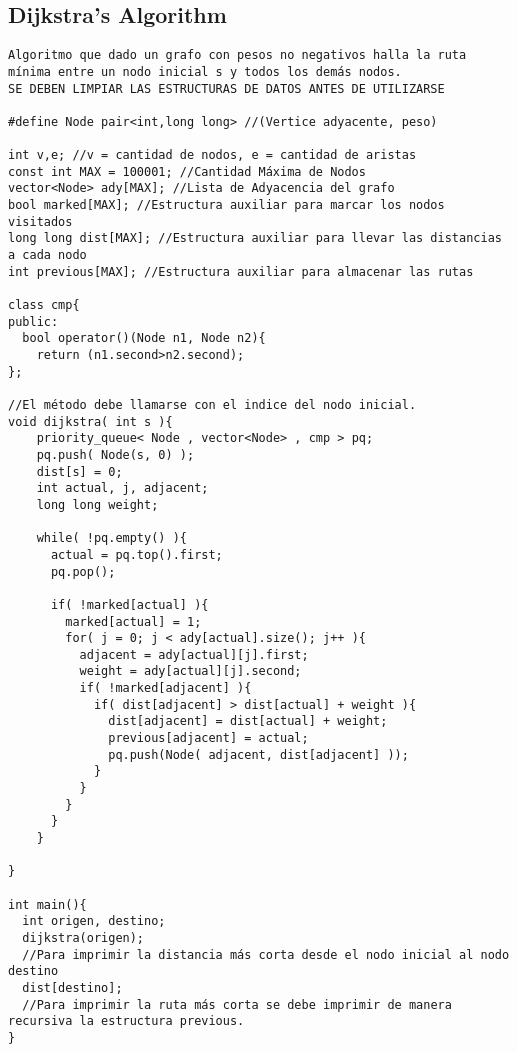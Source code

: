 \documentclass[10pt,letterpaper,twocolumn,twosided]{article}
\begin{document}
\subsection{Dijkstra's Algorithm}
\begin{lstlisting}
Algoritmo que dado un grafo con pesos no negativos halla la ruta mínima entre un nodo inicial s y todos los demás nodos.
SE DEBEN LIMPIAR LAS ESTRUCTURAS DE DATOS ANTES DE UTILIZARSE

#define Node pair<int,long long> //(Vertice adyacente, peso)

int v,e; //v = cantidad de nodos, e = cantidad de aristas
const int MAX = 100001; //Cantidad Máxima de Nodos
vector<Node> ady[MAX]; //Lista de Adyacencia del grafo
bool marked[MAX]; //Estructura auxiliar para marcar los nodos visitados
long long dist[MAX]; //Estructura auxiliar para llevar las distancias a cada nodo
int previous[MAX]; //Estructura auxiliar para almacenar las rutas

class cmp{
public:
  bool operator()(Node n1, Node n2){
    return (n1.second>n2.second);
};

//El método debe llamarse con el indice del nodo inicial.
void dijkstra( int s ){
    priority_queue< Node , vector<Node> , cmp > pq;
    pq.push( Node(s, 0) );
    dist[s] = 0;
    int actual, j, adjacent;
    long long weight;

    while( !pq.empty() ){
      actual = pq.top().first;
      pq.pop();

      if( !marked[actual] ){
        marked[actual] = 1;
        for( j = 0; j < ady[actual].size(); j++ ){
          adjacent = ady[actual][j].first;
          weight = ady[actual][j].second;
          if( !marked[adjacent] ){
            if( dist[adjacent] > dist[actual] + weight ){
              dist[adjacent] = dist[actual] + weight;
              previous[adjacent] = actual;
              pq.push(Node( adjacent, dist[adjacent] ));
            }
          }
        }
      }
    }

}

int main(){
  int origen, destino;
  dijkstra(origen);
  //Para imprimir la distancia más corta desde el nodo inicial al nodo destino
  dist[destino];
  //Para imprimir la ruta más corta se debe imprimir de manera recursiva la estructura previous.
}\end{lstlisting}
\end{document}
